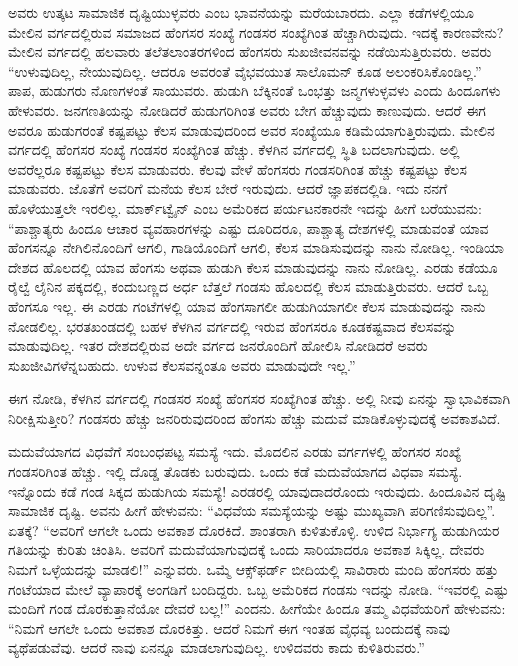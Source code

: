 ಅವರು ಉತ್ಕಟ ಸಾಮಾಜಿಕ ದೃಷ್ಟಿಯುಳ್ಳವರು ಎಂಬ ಭಾವನೆಯನ್ನು ಮರೆಯಬಾರದು. ಎಲ್ಲಾ ಕಡೆಗಳಲ್ಲಿಯೂ ಮೇಲಿನ ವರ್ಗದಲ್ಲಿರುವ ಸಮಾಜದ ಹೆಂಗಸರ ಸಂಖ್ಯೆ ಗಂಡಸರ ಸಂಖ್ಯೆಗಿಂತ ಹೆಚ್ಚಾಗಿರುವುದು. ಇದಕ್ಕೆ ಕಾರಣವೇನು? ಮೇಲಿನ ವರ್ಗದಲ್ಲಿ ಹಲವಾರು ತಲೆತಲಾಂತರಗಳಿಂದ ಹೆಂಗಸರು ಸುಖಜೀವನವನ್ನು ನಡೆಯಿಸುತ್ತಿರುವರು. ಅವರು “ಉಳುವುದಿಲ್ಲ, ನೇಯುವುದಿಲ್ಲ. ಆದರೂ ಅವರಂತೆ ವೈಭವಯುತ ಸಾಲೊಮನ್​ ಕೂಡ ಅಲಂಕರಿಸಿಕೊಂಡಿಲ್ಲ.” ಪಾಪ, ಹುಡುಗರು ನೊಣಗಳಂತೆ ಸಾಯುವರು. ಹುಡುಗಿ ಬೆಕ್ಕಿನಂತೆ ಒಂಭತ್ತು ಜನ್ಮಗಳುಳ್ಳವಳು ಎಂದು ಹಿಂದೂಗಳು ಹೇಳುವರು. ಜನಗಣತಿಯನ್ನು ನೋಡಿದರೆ ಹುಡುಗರಿಗಿಂತ ಅವರು ಬೇಗ ಹೆಚ್ಚುವುದು ಕಾಣುವುದು. ಆದರೆ ಈಗ ಅವರೂ ಹುಡುಗರಂತೆ ಕಷ್ಟಪಟ್ಟು ಕೆಲಸ ಮಾಡುವುದರಿಂದ ಅವರ ಸಂಖ್ಯೆಯೂ ಕಡಿಮೆಯಾಗುತ್ತಿರುವುದು. ಮೇಲಿನ ವರ್ಗದಲ್ಲಿ ಹೆಂಗಸರ ಸಂಖ್ಯೆ ಗಂಡಸರ ಸಂಖ್ಯೆಗಿಂತ ಹೆಚ್ಚು. ಕೆಳಗಿನ ವರ್ಗದಲ್ಲಿ ಸ್ಥಿತಿ ಬದಲಾಗುವುದು. ಅಲ್ಲಿ ಅವರೆಲ್ಲರೂ ಕಷ್ಟಪಟ್ಟು ಕೆಲಸ ಮಾಡುವರು. ಕೆಲವು ವೇಳೆ ಹೆಂಗಸರು ಗಂಡಸರಿಗಿಂತ ಹೆಚ್ಚು ಕಷ್ಟಪಟ್ಟು ಕೆಲಸ ಮಾಡುವರು. ಜೊತೆಗೆ ಅವರಿಗೆ ಮನೆಯ ಕೆಲಸ ಬೇರೆ ಇರುವುದು. ಆದರೆ ಜ್ಞಾಪಕದಲ್ಲಿಡಿ. ಇದು ನನಗೆ ಹೊಳೆಯುತ್ತಲೇ ಇರಲಿಲ್ಲ. ಮಾರ್ಕ್​ಟ್ವೈನ್​ ಎಂಬ ಅಮೆರಿಕದ ಪರ್ಯಟನಕಾರನೇ ಇದನ್ನು ಹೀಗೆ ಬರೆಯುವನು: “ಪಾಶ್ಚಾತ್ಯರು ಹಿಂದೂ ಆಚಾರ ವ್ಯವಹಾರಗಳನ್ನು ಎಷ್ಟು ದೂರಿದರೂ, ಪಾಶ್ಚಾತ್ಯ ದೇಶಗಳಲ್ಲಿ ಮಾಡುವಂತೆ ಯಾವ ಹೆಂಗಸನ್ನೂ ನೇಗಿಲಿನೊಂದಿಗೆ ಆಗಲಿ, ಗಾಡಿಯೊಂದಿಗೆ ಆಗಲಿ, ಕೆಲಸ ಮಾಡಿಸುವುದನ್ನು ನಾನು ನೋಡಿಲ್ಲ. ಇಂಡಿಯಾ ದೇಶದ ಹೊಲದಲ್ಲಿ ಯಾವ ಹೆಂಗಸು ಅಥವಾ ಹುಡುಗಿ ಕೆಲಸ ಮಾಡುವುದನ್ನು ನಾನು ನೋಡಿಲ್ಲ. ಎರಡು ಕಡೆಯೂ ರೈಲ್ವೆ ಲೈನಿನ ಪಕ್ಕದಲ್ಲಿ, ಕಂದುಬಣ್ಣದ ಅರ್ಧ ಬೆತ್ತಲೆ ಗಂಡಸು ಹೊಲದಲ್ಲಿ ಕೆಲಸ ಮಾಡುತ್ತಿರುವರು. ಆದರೆ ಒಬ್ಬ ಹೆಂಗಸೂ ಇಲ್ಲ. ಈ ಎರಡು ಗಂಟೆಗಳಲ್ಲಿ ಯಾವ ಹೆಂಗಸಾಗಲೀ ಹುಡುಗಿಯಾಗಲೀ ಕೆಲಸ ಮಾಡುವುದನ್ನು ನಾನು ನೋಡಲಿಲ್ಲ. ಭರತಖಂಡದಲ್ಲಿ ಬಹಳ ಕೆಳಗಿನ ವರ್ಗದಲ್ಲಿ ಇರುವ ಹೆಂಗಸರೂ ಕೂಡ\break ಕಷ್ಟವಾದ ಕೆಲಸವನ್ನು ಮಾಡುವುದಿಲ್ಲ. ಇತರ ದೇಶದಲ್ಲಿರುವ ಅದೇ ವರ್ಗದ ಜನರೊಂದಿಗೆ ಹೋಲಿಸಿ ನೋಡಿದರೆ ಅವರು ಸುಖಜೀವಿಗಳೆನ್ನಬಹುದು. ಉಳುವ ಕೆಲಸವನ್ನಂತೂ ಅವರು ಮಾಡುವುದೇ ಇಲ್ಲ.”

ಈಗ ನೋಡಿ, ಕೆಳಗಿನ ವರ್ಗದಲ್ಲಿ ಗಂಡಸರ ಸಂಖ್ಯೆ ಹೆಂಗಸರ ಸಂಖ್ಯೆಗಿಂತ ಹೆಚ್ಚು. ಅಲ್ಲಿ ನೀವು ಏನನ್ನು ಸ್ವಾಭಾವಿಕವಾಗಿ ನಿರೀಕ್ಷಿಸುತ್ತೀರಿ? ಗಂಡಸರು ಹೆಚ್ಚು ಜನರಿರುವುದರಿಂದ ಹೆಂಗಸು ಹೆಚ್ಚು ಮದುವೆ ಮಾಡಿಕೊಳ್ಳುವುದಕ್ಕೆ ಅವಕಾಶವಿದೆ.

ಮದುವೆಯಾಗದ ವಿಧವೆಗೆ ಸಂಬಂಧಪಟ್ಟ ಸಮಸ್ಯೆ ಇದು. ಮೊದಲಿನ ಎರಡು ವರ್ಗಗಳಲ್ಲಿ ಹೆಂಗಸರ ಸಂಖ್ಯೆ ಗಂಡಸರಿಗಿಂತ ಹೆಚ್ಚು. ಇಲ್ಲಿ ದೊಡ್ಡ ತೊಡಕು ಬರುವುದು. ಒಂದು ಕಡೆ ಮದುವೆಯಾಗದ ವಿಧವಾ ಸಮಸ್ಯೆ. ಇನ್ನೊಂದು ಕಡೆ ಗಂಡ ಸಿಕ್ಕದ ಹುಡುಗಿಯ ಸಮಸ್ಯೆ! ಎರಡರಲ್ಲಿ ಯಾವುದಾದರೊಂದು ಇರುವುದು. ಹಿಂದೂವಿನ ದೃಷ್ಟಿ ಸಾಮಾಜಿಕ ದೃಷ್ಟಿ. ಅವನು ಹೀಗೆ ಹೇಳುವನು: “ವಿಧವೆಯ ಸಮಸ್ಯೆಯನ್ನು ಅಷ್ಟು ಮುಖ್ಯವಾಗಿ ಪರಿಗಣಿಸುವುದಿಲ್ಲ”. ಏತಕ್ಕೆ? “ಅವರಿಗೆ ಆಗಲೇ ಒಂದು ಅವಕಾಶ ದೊರಕಿದೆ. ಶಾಂತರಾಗಿ ಕುಳಿತುಕೊಳ್ಳಿ. ಉಳಿದ ನಿರ್ಭಾಗ್ಯ ಹುಡುಗಿಯರ ಗತಿಯನ್ನು ಕುರಿತು ಚಿಂತಿಸಿ. ಅವರಿಗೆ ಮದುವೆಯಾಗುವುದಕ್ಕೆ ಒಂದು ಸಾರಿಯಾದರೂ ಅವಕಾಶ ಸಿಕ್ಕಿಲ್ಲ. ದೇವರು ನಿಮಗೆ ಒಳ್ಳೆಯದನ್ನು ಮಾಡಲಿ!” ಎನ್ನುವರು. ಒಮ್ಮೆ ಆಕ್ಸ್​ಫರ್ಡ್​ ಬೀದಿಯಲ್ಲಿ ಸಾವಿರಾರು ಮಂದಿ ಹೆಂಗಸರು ಹತ್ತು ಗಂಟೆಯಾದ ಮೇಲೆ ವ್ಯಾಪಾರಕ್ಕೆ ಅಂಗಡಿಗೆ ಬಂದಿದ್ದರು. ಒಬ್ಬ ಅಮೆರಿಕದ ಗಂಡಸು ಇದನ್ನು ನೋಡಿ. “ಇವರಲ್ಲಿ ಎಷ್ಟು ಮಂದಿಗೆ ಗಂಡ ದೊರಕುತ್ತಾನೆಯೋ ದೇವರೆ ಬಲ್ಲ!” ಎಂದನು. ಹೀಗೆಯೇ ಹಿಂದೂ ತಮ್ಮ ವಿಧವೆಯರಿಗೆ ಹೇಳುವನು: “ನಿಮಗೆ ಆಗಲೇ ಒಂದು ಅವಕಾಶ ದೊರಕಿತ್ತು. ಆದರೆ ನಿಮಗೆ ಈಗ ಇಂತಹ ವೈಧವ್ಯ ಬಂದುದಕ್ಕೆ ನಾವು ವ್ಯಥೆಪಡುವೆವು. ಆದರೆ ನಾವು ಏನನ್ನೂ ಮಾಡಲಾಗುವುದಿಲ್ಲ. ಉಳಿದವರು ಕಾದು ಕುಳಿತಿರುವರು.”

